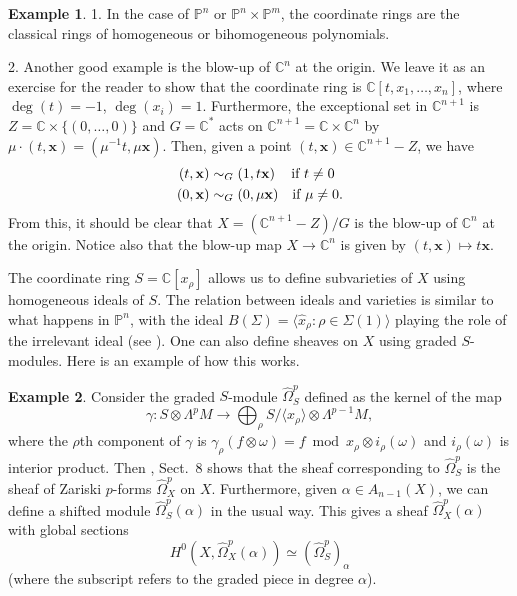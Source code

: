 \documentclass{amsart}
\theoremstyle{plain}
\theoremstyle{definition}
\newtheorem*{example}{Example}
\begin{document}
\begin{example} 1. In the case of $\mathbb{P}^n$ or $\mathbb{P}^n\times\mathbb{P}^m$, the coordinate rings are the classical rings of
homogeneous or bihomogeneous polynomials.  

	2. Another good example is the blow-up of $\mathbb{C}^n$ at the
origin.  We leave it as an exercise for the reader to show that the
coordinate ring is $\mathbb{C}[t,x_1,\dots,x_n]$, where $\deg(t) = -1$,
$\deg(x_i) = 1$.  Furthermore, the exceptional set in $\mathbb{C}^{n+1}$
is $Z = \mathbb{C}\times \{(0,\dots,0)\}$ and $G = \mathbb{C}^*$ acts on
$\mathbb{C}^{n+1} = \mathbb{C}\times\mathbb{C}^n$ by $\mu\cdot(t,\mathbf{x}) =
(\mu^{-1}t,\mu \mathbf{x})$.  Then, given a point $(t,\mathbf{x}) \in
\mathbb{C}^{n+1} - Z$, we have
\begin{align*}
(t,\mathbf{x}) &\sim_G (1,t\mathbf{x})\quad  \,\hbox{if $t \ne 0$}\\
(0,\mathbf{x}) &\sim_G (0,\mu\mathbf{x})\quad \hbox{if $\mu \ne 0$}.
\end{align*}
{}From this, it should be clear that $X = (\mathbb{C}^{n+1} - Z)/G$ is the
blow-up of $\mathbb{C}^{n}$ at the origin.  Notice also that the
blow-up map $X \to \mathbb{C}^{n}$ is given by $(t,\mathbf{x}) \mapsto
t\mathbf{x}$.
\end{example}

	The coordinate ring $S = \mathbb{C}[x_\rho]$ allows us to define
subvarieties of $X$ using homogeneous ideals of $S$.  The relation
between ideals and varieties is similar to what happens in $\mathbb{P}^n$, with the ideal $B(\Sigma) = \langle \hat x_\rho : \rho \in
\Sigma(1)\rangle$ playing the role of the irrelevant ideal (see
\cite{Cox2}).  One can also define sheaves on $X$ using graded
$S$-modules.  Here is an example of how this works.

\begin{example} Consider the graded $S$-module $\widehat\Omega^p_S$
defined as the kernel of the map  
\[
\gamma : S\otimes \Lambda^pM \longrightarrow \bigoplus_\rho
S/\langle x_\rho\rangle \otimes \Lambda^{p-1}M,
\]
where the $\rho$th component of $\gamma$ is $\gamma_\rho(f\otimes
\omega) = f \bmod x_\rho \otimes i_\rho(\omega)$ and
$i_\rho(\omega)$ is interior product.  Then \cite{BC}, Sect.~8 shows that the sheaf corresponding to $\widehat\Omega^p_S$
is the sheaf of Zariski $p$-forms $\widehat\Omega_X^p$ on $X$.
Furthermore, given $\alpha \in A_{n-1}(X)$, we can define a shifted
module $\widehat\Omega^p_S(\alpha)$ in the usual way.  This gives a
sheaf $\widehat\Omega^p_X(\alpha)$ with global sections
\[
H^0(X,\widehat\Omega^p_X(\alpha)) \simeq (\widehat\Omega^p_S)_\alpha
\]
(where the subscript refers to the graded piece in degree $\alpha$).  
\end{example}
\end{document}
